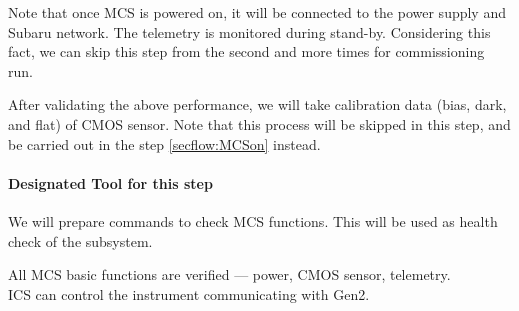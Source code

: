 
Note that once MCS is powered on, it will be connected to the power supply and Subaru network.
The telemetry is monitored during stand-by.
Considering this fact, we can skip this step from the second and more times for commissioning run.

After validating the above performance, we will take calibration data (bias, dark, and flat) of CMOS sensor.
Note that this process will be skipped in this step, and be carried out in the step \ref{secflow:MCSon} instead.

\paragraph{Designated Tool for this step}
We will prepare commands to check MCS functions.
This will be used as health check of the subsystem.

\begin{itembox}[l]{}
All MCS basic functions are verified --- power, CMOS sensor, telemetry. \\
ICS can control the instrument communicating with Gen2.

\end{itembox}